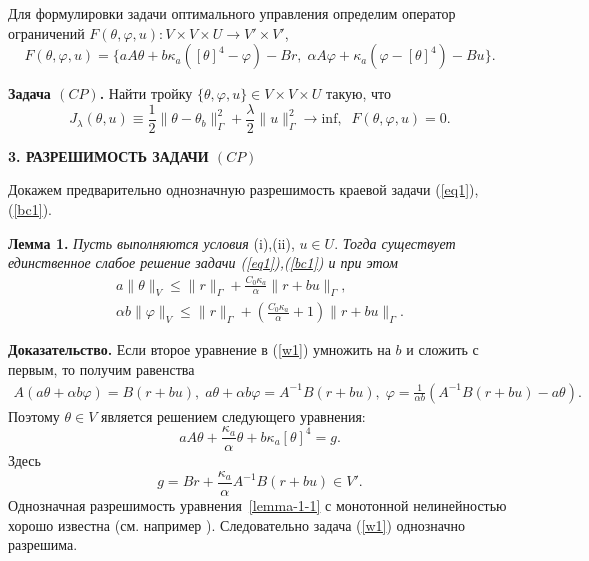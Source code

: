 \documentclass[12pt]{article}
\begin{document}
    Для формулировки задачи оптимального управления определим оператор
    ограничений $F(\theta, \varphi, u) : V \times V \times U \rightarrow V' \times V'$,
    \[
        F(\theta, \varphi, u) = \{ aA\theta + b \kappa_a ( [\theta]^4- \varphi) - Br,\;
        \alpha A \varphi + \kappa_a (\varphi -[\theta]^4) - Bu\}.
    \]


    \textbf{Задача $(CP)$.} Найти тройку $\{\theta, \varphi, u \} \in V \times V \times U$
    такую, что
    \begin{equation}
        \label{CP}
        J_\lambda(\theta, u) \equiv \frac{1}{2}\|\theta -\theta_b\|^2_\Gamma
        + \frac{\lambda}{2}\|u\|^2_\Gamma \rightarrow \text{inf},\;\; F(\theta, \varphi, u)=0.
    \end{equation}





    \begin{center}
        \textbf{3. РАЗРЕШИМОСТЬ ЗАДАЧИ $(CP)$}
    \end{center}

    Докажем предварительно однозначную разрешимость краевой задачи (\ref{eq1}),(\ref{bc1}).

    \textbf{Лемма 1.}
    {\it
    Пусть выполняются условия} (i),(ii), $u\in U$. {\it Тогда
    существует единственное слабое решение задачи (\ref{eq1}),(\ref{bc1}) и при этом}
    \begin{equation}
        \label{E1}
        \begin{aligned}
            a\|\theta\|_V \leq \|r\|_\Gamma + \frac{C_0\kappa_a}{\alpha}\|r+bu\|_\Gamma, \\
            \alpha b \|\varphi\|_V \leq \|r\|_\Gamma +
            \left(\frac{C_0\kappa_a}{\alpha} + 1\right)\|r+bu\|_\Gamma.
        \end{aligned}
    \end{equation}

    {\bf Доказательство.}
    Если второе уравнение в (\ref{w1}) умножить на $b$ и сложить с первым, то получим равенства
    \begin{gather*}
        A \left( a \theta + \alpha b \varphi \right) = B(r + bu),\;
        a\theta + \alpha b \varphi = A^{-1}B(r + bu),\;
        \varphi = \frac{1}{\alpha b}(A^{-1}B(r +bu) - a\theta).
    \end{gather*}
    Поэтому $\theta \in V$ является решением следующего уравнения:
    \begin{equation}
        \label{lemma-1-1}
        a A \theta + \frac{\kappa_a}{\alpha} \theta + b\kappa_a [\theta]^4 = g.
    \end{equation}
    Здесь $$g = Br + \frac{\kappa_a}{\alpha}A^{-1}B(r+bu) \in V'.$$
    Однозначная разрешимость уравнения~\eqref{lemma-1-1} с монотонной нелинейностью
    хорошо известна (см. например \cite{Kufner}). Следовательно задача (\ref{w1})
    однозначно разрешима.
\end{document}
